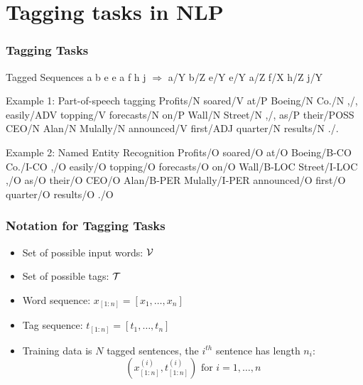 




\section{Tagging tasks in NLP}
\frame{\tableofcontents[currentsection]}
\newcommand{\postag}[1]{{\color{red}/#1}}
\newcommand{\nertag}[1]{{\color{blue}/#1}}

\begin{frame}
\frametitle{Tagging Tasks}
\begin{block}{Tagged Sequences}
a b e e a f h j $\Rightarrow$ a\postag{Y} b\postag{Z} e\postag{Y} e\postag{Y} a\postag{Z} f\postag{X} h\postag{Z} j\postag{Y}
\end{block}
\pause
\begin{alertblock}{Example 1: Part-of-speech tagging}
Profits\postag{N} soared\postag{V} at\postag{P} Boeing\postag{N} Co.\postag{N} ,\postag{,} easily\postag{ADV} topping\postag{V} forecasts\postag{N} on\postag{P} Wall\postag{N} Street\postag{N} ,\postag{,} as\postag{P} their\postag{POSS} CEO\postag{N} Alan\postag{N} Mulally\postag{N} announced\postag{V} first\postag{ADJ} quarter\postag{N} results\postag{N} .\postag{.}
\end{alertblock}
\pause
\begin{alertblock}{Example 2: Named Entity Recognition}
Profits\postag{O} soared\postag{O} at\postag{O} Boeing\nertag{B-CO} Co.\nertag{I-CO} ,\postag{O} easily\postag{O} topping\postag{O} forecasts\postag{O} on\postag{O} Wall\nertag{B-LOC} Street\nertag{I-LOC} ,\postag{O} as\postag{O} their\postag{O} CEO\postag{O} Alan\nertag{B-PER} Mulally\nertag{I-PER} announced\postag{O} first\postag{O} quarter\postag{O} results\postag{O} .\postag{O}
\end{alertblock}
\end{frame}


\begin{frame}
\frametitle{Notation for Tagging Tasks}
\begin{itemize}[<+->]
\item Set of possible input words: ${\cal V}$
\item Set of possible tags: ${\cal T}$
\item Word sequence: $x_{[1:n]} = [x_1, \ldots, x_n]$
\item Tag sequence: $t_{[1:n]} = [t_1, \ldots, t_n]$
\item Training data is $N$ tagged sentences, the $i^{th}$ sentence has length $n_i$:
\[ (x_{[1:n]}^{(i)}, t_{[1:n]}^{(i)}) \textrm{ for } i = 1, \ldots, n \]
\end{itemize}
\end{frame}

